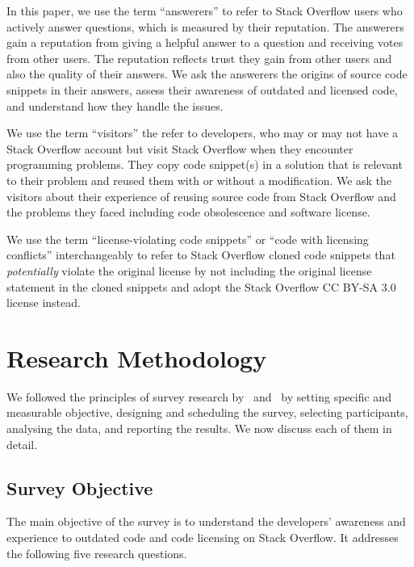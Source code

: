 \documentclass{svjour3}                     %
\begin{document}
In this paper, we use the term ``answerers'' to refer to Stack Overflow users
who actively answer questions, which is measured by their reputation. The
answerers gain a reputation from giving a helpful answer to a question and
receiving votes from other users. The reputation reflects trust they gain from
other users and also the quality of their answers. We ask the answerers the
origins of source code snippets in their answers, assess their awareness of
outdated and licensed code, and understand how they handle the issues.

We use the term ``visitors'' the refer to developers, who may or may not have a
Stack Overflow account but visit Stack Overflow when they encounter programming
problems. They copy code snippet(s) in a solution that is relevant to their
problem and reused them with or without a modification. We ask the visitors
about their experience of reusing source code from Stack Overflow and the
problems they faced including code obsolescence and software license.

We use the term ``license-violating code snippets'' or ``code with licensing conflicts''
interchangeably to refer to Stack Overflow cloned code snippets that \textit{potentially} violate the
original license by not including the original license statement in the cloned snippets and
adopt the Stack Overflow CC BY-SA 3.0 license instead.

\section{Research Methodology}
We followed the principles of survey research by~\cite{Pfleeger2001}
and~\cite{Kitchenham2002} by setting specific and measurable objective,
designing and scheduling the survey, selecting participants, analysing the data,
and reporting the results. We now discuss each of them in detail.

\subsection{Survey Objective}
The main objective of the survey is to understand the developers' awareness and
experience to outdated code and code licensing on Stack Overflow. It addresses
the following five research questions.
\end{document}
